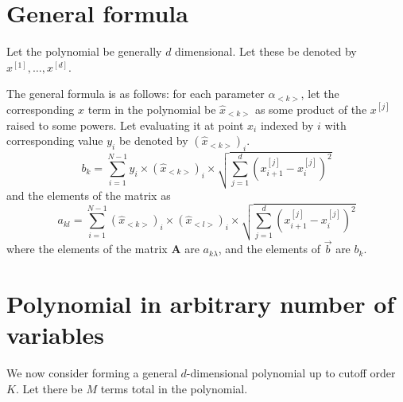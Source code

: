 \documentclass[11pt]{article}
\newcommand{\xdim}[1]{x^{[#1]}}
\begin{document}

\section{General formula}


Let the polynomial be generally $d$ dimensional. Let these be denoted by $\xdim{1},\dots,\xdim{d}$. 

The general formula is as follows: for each parameter $\alpha_{<k>}$, let the corresponding $x$ term in the polynomial be $\hat{x}_{<k>}$ as some product of the $\xdim{j}$ raised to some powers. Let evaluating it at point $x_i$ indexed by $i$ with corresponding value $y_i$ be denoted by $(\hat{x}_{<k>})_i$.
\begin{equation}
b_k = 
\sum_{i=1}^{N-1} 
y_i \times
(\hat{x}_{<k>})_i \times
\sqrt{ \sum_{j=1}^d ( \xdim{j}_{i+1} - \xdim{j}_i )^2 }
\end{equation}
and the elements of the matrix as
\begin{equation}
a_{kl} = \sum_{i=1}^{N-1} 
(\hat{x}_{<k>})_i \times
(\hat{x}_{<l>})_i \times
\sqrt{ \sum_{j=1}^d ( \xdim{j}_{i+1} - \xdim{j}_i )^2 }
\end{equation}
where the elements of the matrix $\boldsymbol{A}$ are $a_{k\lambda}$, and the elements of $\vec{b}$ are $b_k$.



\section{Polynomial in arbitrary number of variables}


We now consider forming a general $d$-dimensional polynomial up to cutoff order $K$. Let there be $M$ terms total in the polynomial. 
\end{document}
